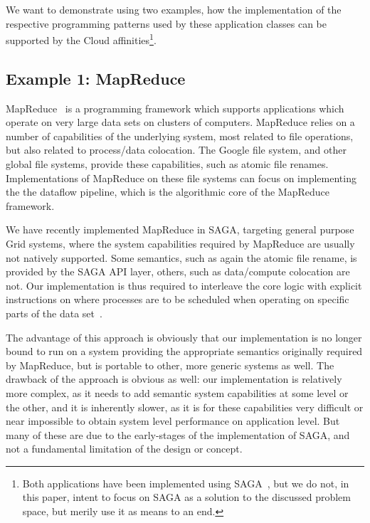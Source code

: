 \documentclass{article}
\begin{document}
 We want to demonstrate using two examples, how the implementation of the
 respective programming patterns used by these application classes can
 be supported by the Cloud affinities\footnote{Both applications have
 been implemented using SAGA~\cite{saga-core}, but we do not, in this
 paper, intent to focus on SAGA as a solution to the discussed problem
 space, but merily use it as means to an end.}.

 \subsection{Example 1: MapReduce}

  MapReduce~\cite{mapreduce-paper} is a programming framework which supports
  applications which operate on very large data sets on clusters of
  computers.  MapReduce relies on a number of capabilities of the
  underlying system, most related to file operations, but also related
  to process/data colocation.  The Google file system, and other
  global file systems, provide these capabilities, such as atomic file
  renames.  Implementations of MapReduce on these file systems can
  focus on implementing the the dataflow pipeline, which is the
  algorithmic core of the MapReduce framework.

  We have recently implemented MapReduce in SAGA, targeting
  general purpose Grid systems, where the system capabilities required
  by MapReduce are usually not natively supported.  Some semantics,
  such as again the atomic file rename, is provided by the SAGA API
  layer, others, such as data/compute colocation are not.  Our
  implementation is thus required to interleave the core logic with
  explicit instructions on where processes are to be scheduled when
  operating on specific parts of the data set~\cite{gsoc-saga}.

  The advantage of this approach is obviously that our implementation
  is no longer bound to run on a system providing the appropriate
  semantics originally required by MapReduce, but is portable to
  other, more generic systems as well.  The drawback of the approach
  is obvious as well: our implementation is relatively more complex,
  as it needs to add semantic system capabilities at some level or the
  other, and it is inherently slower, as it is for these capabilities
  very difficult or near impossible to obtain system level performance
  on application level.  But many of these are due to the early-stages
  of the implementation of SAGA, and not a fundamental limitation of
  the design or concept.
\end{document}
